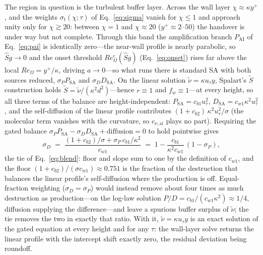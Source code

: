 \documentclass[journal]{new-aiaa}
\begin{document}
The region in question is the turbulent buffer layer. Across the wall
layer $\chi\!\approx\!\kappa y^+$, and the weights $\sigma_t(\chi;\tau)$ of
Eq.~\eqref{eq:sigma} vanish for $\chi\!\le\!1$ and approach unity only for
$\chi\!\gtrsim\!20$: between $\chi\!=\!1$ and $\chi\!\approx\!20$
($y^+\!\approx\!2$--$50$) the handover is under way but not complete.
Through this band the amplification branch $P_\mathrm{AI}$ of
Eq.~\eqref{eq:pai} is identically zero---the near-wall profile is nearly
parabolic, so $\hat S g\!\to\!0$ and the onset threshold $Re_\Omega^{\mathrm c}(\hat S g)$
(Eq.~\eqref{eq:onset}) rises far above the local $Re_\Omega\!=\!y^+\!/\kappa$,
driving $a\!\to\!0$---so what runs there is standard SA with both sources
reduced, $\sigma_P P_\mathrm{SA}$ and $\sigma_D D_\mathrm{SA}$. On the
linear solution $\tilde\nu\!=\!\kappa u_\tau y$, Spalart's $\tilde S$
construction holds $\tilde S\!=\!\tilde\nu/(\kappa^2d^2)$---hence
$r\!\equiv\!1$ and $f_w\!\equiv\!1$---at every height, so all three terms
of the balance are height-independent: $P_\mathrm{SA}\!=\!c_{b1}u_\tau^2$,
$D_\mathrm{SA}\!=\!c_{w1}\kappa^2u_\tau^2$, and the self-diffusion of the
linear profile contributes $(1+c_{b2})\,\kappa^2u_\tau^2/\sigma$ (the
molecular term vanishes with the curvature, so $c_{\nu,\mathrm{ai}}$ plays
no part). Requiring the gated balance
$\sigma_P P_\mathrm{SA}-\sigma_D D_\mathrm{SA}+\mathrm{diffusion}\!=\!0$
to hold pointwise gives
\begin{equation}
  \sigma_D \;=\; \frac{(1+c_{b2})/\sigma + \sigma_P\,c_{b1}/\kappa^2}{c_{w1}}
  \;=\; 1-\frac{c_{b1}}{\kappa^2c_{w1}}\,(1-\sigma_P),
  \label{eq:sigmadtie}
\end{equation}
the tie of Eq.~\eqref{eq:blend}: floor and slope sum to one by the
definition of $c_{w1}$, and the floor
$(1+c_{b2})/(\sigma c_{w1})\!\approx\!0.751$ is the fraction of the
destruction that balances the linear profile's self-diffusion where the
production is off. Equal-fraction weighting ($\sigma_D\!=\!\sigma_P$)
would instead remove about four times as much destruction as
production---on the log-law solution
$P/D\!=\!c_{b1}/(c_{w1}\kappa^2)\!\approx\!1/4$, diffusion supplying the
difference---and leave a spurious buffer surplus of $\tilde\nu$; the tie
removes the two in exactly that ratio. With it,
$\tilde\nu\!=\!\kappa u_\tau y$ is an exact solution of the gated
equation at every height and for any $\tau$: the wall-layer solve returns
the linear profile with the intercept shift exactly zero, the residual
deviation being roundoff.
\end{document}
